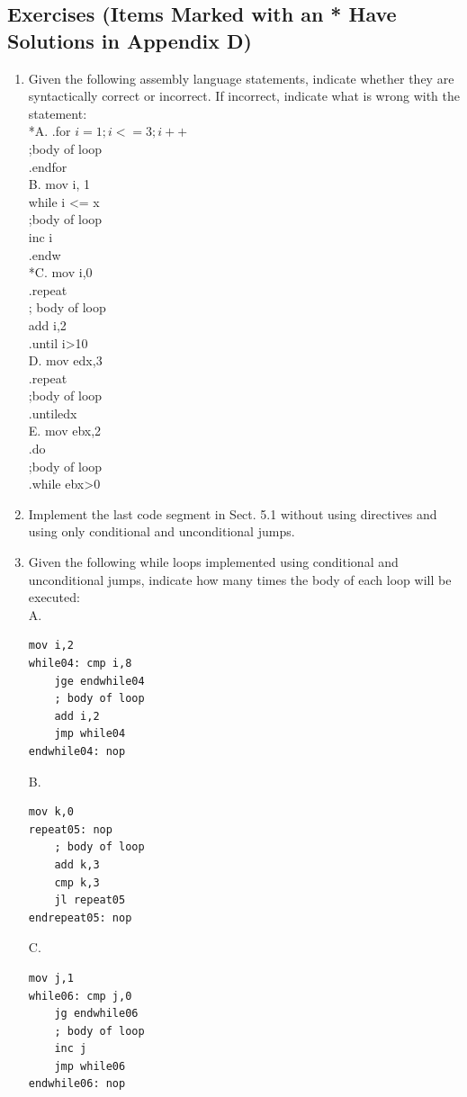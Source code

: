 \documentclass[10pt]{book}
\begin{document}
\subsection{Exercises (Items Marked with an * Have Solutions in Appendix D)}
\begin{enumerate}
  \item Given the following assembly language statements, indicate whether they are syntactically correct or incorrect. If incorrect, indicate what is wrong with the statement:\\
*A. .for $i=1 ; i<=3 ; i++$\\
;body of loop\\
.endfor\\
B. mov i, 1\\
while i <= x\\
;body of loop\\
inc i\\
.endw\\
*C. mov i,0\\
.repeat\\
; body of loop\\
add i,2\\
.until i>10\\
D. mov edx,3\\
.repeat\\
;body of loop\\
.untiledx\\
E. mov ebx,2\\
.do\\
;body of loop\\
.while ebx>0
  \item Implement the last code segment in Sect. 5.1 without using directives and using only conditional and unconditional jumps.
  \item Given the following while loops implemented using conditional and unconditional jumps, indicate how many times the body of each loop will be executed:\\
A.
\begin{verbatim}
mov i,2
while04: cmp i,8
    jge endwhile04
    ; body of loop
    add i,2
    jmp while04
endwhile04: nop
\end{verbatim}
B.
\begin{verbatim}
mov k,0
repeat05: nop
    ; body of loop
    add k,3
    cmp k,3
    jl repeat05
endrepeat05: nop
\end{verbatim}
C.
\begin{verbatim}
mov j,1
while06: cmp j,0
    jg endwhile06
    ; body of loop
    inc j
    jmp while06
endwhile06: nop
\end{verbatim}
\end{enumerate}
\end{document}
